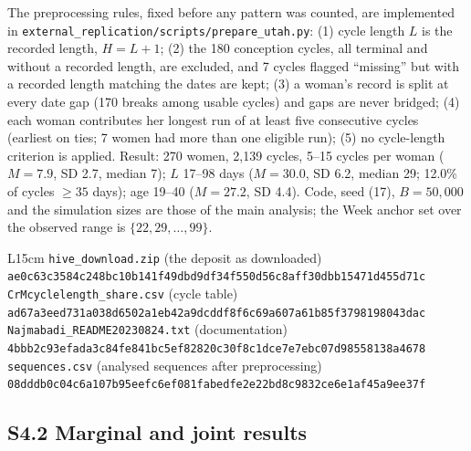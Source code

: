 \documentclass[12pt]{article}
\begin{document}
The preprocessing rules, fixed before any pattern was counted, are implemented in
\texttt{external\_replication/scripts/prepare\_utah.py}: (1) cycle length $L$ is the
recorded length, $H = L + 1$; (2) the 180 conception cycles, all terminal and without a
recorded length, are excluded, and 7 cycles flagged ``missing'' but with a recorded length
matching the dates are kept; (3) a woman's record is split at every date gap (170 breaks
among usable cycles) and gaps are never bridged; (4) each woman contributes her longest run
of at least five consecutive cycles (earliest on ties; 7 women had more than one eligible
run); (5) no cycle-length criterion is applied. Result: 270 women, 2,139 cycles, 5--15
cycles per woman ($M = 7.9$, SD 2.7, median 7); $L$ 17--98 days ($M = 30.0$, SD 6.2,
median 29; 12.0\% of cycles $\geq 35$ days); age 19--40 ($M = 27.2$, SD 4.4). Code, seed
(17), $B = 50{,}000$ and the simulation sizes are those of the main analysis; the Week
anchor set over the observed range is $\{22, 29, \ldots, 99\}$.

\begin{table}[!htbp]
\centering
\caption{Files of the external replication and their SHA-256 checksums.}
\label{tab:si-ext-files}
\smallskip
\small
\begin{tabular}{L{15cm}}
\toprule
\texttt{hive\_download.zip} (the deposit as downloaded)\newline
{\footnotesize\texttt{ae0c63c3584c248bc10b141f49dbd9df34f550d56c8aff30dbb15471d455d71c}} \\
\addlinespace
\texttt{CrMcyclelength\_share.csv} (cycle table)\newline
{\footnotesize\texttt{ad67a3eed731a038d6502a1eb42a9dcddf8f6c69a607a61b85f3798198043dac}} \\
\addlinespace
\texttt{Najmabadi\_README20230824.txt} (documentation)\newline
{\footnotesize\texttt{4bbb2c93efada3c84fe841bc5ef82820c30f8c1dce7e7ebc07d98558138a4678}} \\
\addlinespace
\texttt{sequences.csv} (analysed sequences after preprocessing)\newline
{\footnotesize\texttt{08dddb0c04c6a107b95eefc6ef081fabedfe2e22bd8c9832ce6e1af45a9ee37f}} \\
\bottomrule
\end{tabular}
\end{table}

\subsection*{S4.2 Marginal and joint results}
\end{document}
